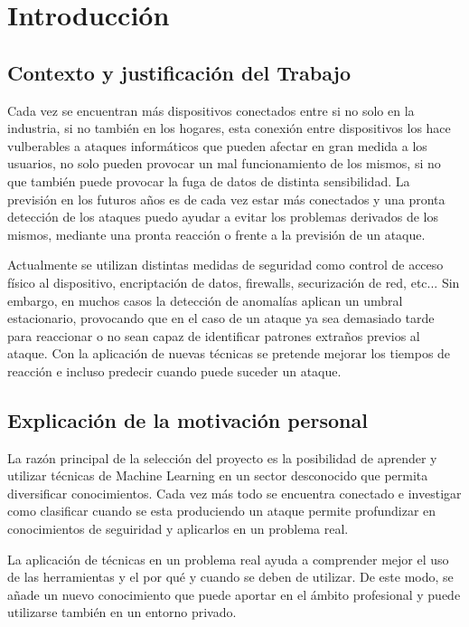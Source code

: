 \chapter{Introducción}
\label{chapter:introduccion}


\section{Contexto y justificación del Trabajo}
Cada vez se encuentran más dispositivos conectados entre si no solo en la industria, si no también en los hogares, esta conexión entre dispositivos los hace vulberables a ataques informáticos que pueden afectar en gran medida a los usuarios, no solo pueden provocar un mal funcionamiento de los mismos, si no que también puede provocar la fuga de datos de distinta sensibilidad. La previsión en los futuros años es de cada vez estar más conectados y una pronta detección de los ataques puedo ayudar a evitar los problemas derivados de los mismos, mediante una pronta reacción o frente a la previsión de un ataque.

\vspace{0.5cm}

Actualmente se utilizan distintas medidas de seguridad como control de acceso físico al dispositivo, encriptación de datos, firewalls, securización de red, etc... Sin embargo, en muchos casos la detección de anomalías aplican un umbral estacionario, provocando que en el caso de un ataque ya sea demasiado tarde para reaccionar o no sean capaz de identificar patrones extraños previos al ataque. Con la aplicación de nuevas técnicas se pretende mejorar los tiempos de reacción e incluso predecir cuando puede suceder un ataque.

\section{Explicación de la motivación personal}
La razón principal de la selección del proyecto es la posibilidad de aprender y utilizar técnicas de Machine Learning en un sector desconocido que permita diversificar conocimientos. Cada vez más todo se encuentra conectado e investigar como clasificar cuando se esta produciendo un ataque permite profundizar en conocimientos de seguiridad y aplicarlos en un problema real. 

La aplicación de técnicas en un problema real ayuda a comprender mejor el uso de las herramientas y el por qué y cuando se deben de utilizar. De este modo, se añade un nuevo conocimiento que puede aportar en el ámbito profesional y puede utilizarse también en un entorno privado.


